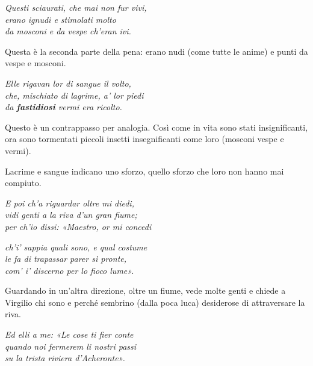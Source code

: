\documentclass[a4paper]{article}
\begin{document}
\begin{center}
    \textit{Questi sciaurati, che mai non fur vivi,} \\
    \textit{erano ignudi e stimolati molto} \\
    \textit{da mosconi e da vespe ch'eran ivi.}
\end{center}

Questa è la seconda parte della pena: erano nudi (come tutte le anime)
e punti da vespe e mosconi.

\begin{center}
    \textit{Elle rigavan lor di sangue il volto,} \\
    \textit{che, mischiato di lagrime, a' lor piedi} \\
    \textit{da \textbf{fastidiosi} vermi era ricolto.}
\end{center}

Questo è un contrappasso per analogia. Così come in vita sono stati insignificanti,
ora sono tormentati piccoli insetti insegnificanti come loro (mosconi vespe e vermi).

Lacrime e sangue indicano uno sforzo, quello sforzo che loro non hanno mai compiuto.

\begin{center}
    \textit{E poi ch'a riguardar oltre mi diedi,} \\
    \textit{vidi genti a la riva d'un gran fiume;} \\
    \textit{per ch'io dissi: «Maestro, or mi concedi}
\end{center}

\begin{center}
    \textit{ch'i' sappia quali sono, e qual costume} \\
    \textit{le fa di trapassar parer sì pronte,} \\
    \textit{com' i' discerno per lo fioco lume».}
\end{center}

Guardando in un'altra direzione, oltre un fiume, vede molte genti e chiede a Virgilio
chi sono e perché sembrino (dalla poca luca) desiderose di attraversare la riva.

\begin{center}
    \textit{Ed elli a me: «Le cose ti fier conte} \\
    \textit{quando noi fermerem li nostri passi} \\
    \textit{su la trista riviera d'Acheronte».}
\end{center}
\end{document}
